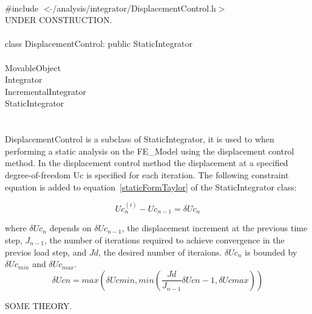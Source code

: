 
   \\
\indent \#include $<\tilde{ }$/analysis/integrator/DisplacementControl.h$>$  \\

UNDER CONSTRUCTION.\\

  \\
\indent class DisplacementControl: public StaticIntegrator  \\

 \\
\indent MovableObject \\
\indent\indent Integrator \\
\indent\indent\indent IncrementalIntegrator \\
\indent\indent\indent\indent StaticIntegrator \\
\indent\indent\indent\indent{} \\

 \\ 
\indent DisplacementControl is a subclass of StaticIntegrator, it is
used to when performing a static analysis on the FE\_Model using the
displacement control method. In the displacement control method the
displacement at a specified degree-of-freedom Uc is specified for each
iteration. The following constraint equation is added to
equation~\ref{staticFormTaylor} of the StaticIntegrator class: 

\[ 
Uc_n^{(i)} - Uc_{n-1} = \delta Uc_n
\]

\noindent where $\delta Uc_n$ depends on $\delta Uc_{n-1}$,
the displacement increment at the previous time step, $J_{n-1}$,
the number of iterations required to achieve convergence in the
previos load step, and $Jd$, the desired number of iteraions. $\delta
Uc_n$ is bounded by $\delta Uc_{min}$  and $\delta Uc_{max}$. \\


\[ 
\delta Ucn = max \left( \delta Uc{min}, min \left(
\frac{Jd}{J_{n-1}} \delta Uc{n-1}, \delta Uc{max} \right) \right)
\]

SOME THEORY.\\

